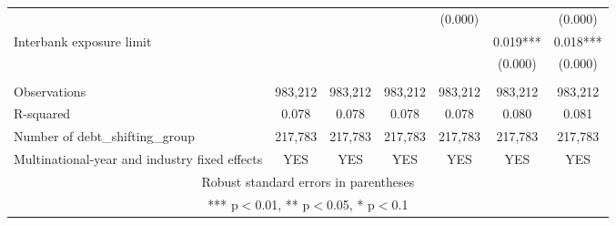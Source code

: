 \begin{tabular}{lcccccc}
 &  &  &  & (0.000) &  & (0.000) \\
Interbank exposure limit &  &  &  &  & 0.019*** & 0.018*** \\
 &  &  &  &  & (0.000) & (0.000) \\
 &  &  &  &  &  &  \\
Observations & 983,212 & 983,212 & 983,212 & 983,212 & 983,212 & 983,212 \\
R-squared & 0.078 & 0.078 & 0.078 & 0.078 & 0.080 & 0.081 \\
Number of debt\_shifting\_group & 217,783 & 217,783 & 217,783 & 217,783 & 217,783 & 217,783 \\
 Multinational-year and industry fixed effects & YES & YES & YES & YES & YES & YES \\ \hline
\multicolumn{7}{c}{ Robust standard errors in parentheses} \\
\multicolumn{7}{c}{ *** p$<$0.01, ** p$<$0.05, * p$<$0.1} \\
\end{tabular}
